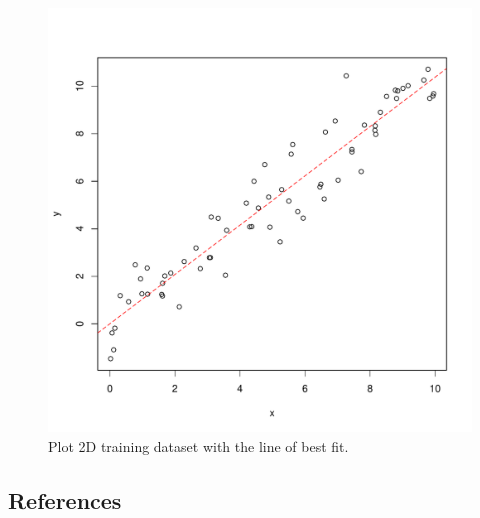 


\begin{figure}[htp]
\centering
\includegraphics[scale=0.45]{a_regression/ordinary_least_squares_regression_result.pdf}
\caption{Plot 2D training dataset with the line of best fit.}
\label{plot:ordinary_least_squares_regression_result}
\end{figure}



\subsection{References}

